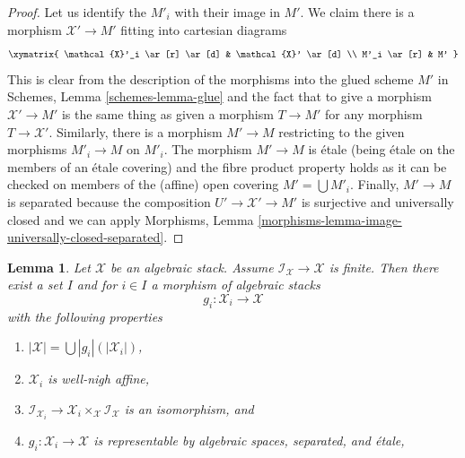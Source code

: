 \documentclass[10pt,a4paper]{amsart}
\theoremstyle{plain}
\newtheorem{lemma}[subsection]{Lemma}
\theoremstyle{definition}
\theoremstyle{remark}
\numberwithin{equation}{subsection}
\begin{document}
\begin{proof}
Let us identify the $M'_i$ with their image in $M'$.
We claim there is a morphism $\mathcal{X}' \to M'$ fitting into
cartesian diagrams
$$
\xymatrix{
\mathcal{X}'_i \ar[r] \ar[d] & \mathcal{X}' \ar[d] \\
M'_i \ar[r] & M'
}
$$
This is clear from the description of the morphisms into the glued scheme $M'$
in Schemes, Lemma \ref{schemes-lemma-glue} and the fact that to give a morphism
$\mathcal{X}' \to M'$ is the same thing as given a morphism $T \to M'$
for any morphism $T \to \mathcal{X}'$.
Similarly, there is a morphism $M' \to M$ restricting to the
given morphisms $M'_i \to M$ on $M'_i$.
The morphism $M' \to M$ is \'etale (being \'etale on the members of an
\'etale covering) and the fibre product property holds as it can
be checked on members of the (affine) open covering $M' = \bigcup M'_i$.
Finally, $M' \to M$ is separated because the composition
$U' \to \mathcal{X}' \to M'$ is surjective and universally closed
and we can apply Morphisms, Lemma
\ref{morphisms-lemma-image-universally-closed-separated}.
\end{proof}

\begin{lemma}
\label{lemma-etale-local-finite-inertia}
Let $\mathcal{X}$ be an algebraic stack. Assume
$\mathcal{I}_\mathcal{X} \to \mathcal{X}$ is finite.
Then there exist a set $I$ and for $i \in I$ a morphism of algebraic stacks
$$
g_i : \mathcal{X}_i \longrightarrow \mathcal{X}
$$
with the following properties
\begin{enumerate}
\item $|\mathcal{X}| = \bigcup |g_i|(|\mathcal{X}_i|)$,
\item $\mathcal{X}_i$ is well-nigh affine,
\item $\mathcal{I}_{\mathcal{X}_i} \to
\mathcal{X}_i \times_\mathcal{X} \mathcal{I}_\mathcal{X}$
is an isomorphism, and
\item $g_i : \mathcal{X}_i \to \mathcal{X}$ is representable
by algebraic spaces, separated, and \'etale,
\end{enumerate}
\end{lemma}
\end{document}
